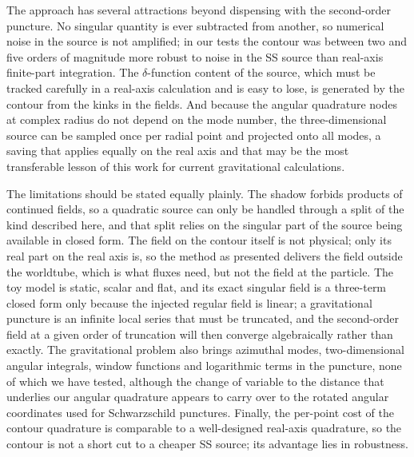 \documentclass[aps,prd,twocolumn,superscriptaddress,nofootinbib,floatfix]{revtex4-2}
\begin{document}
The approach has several attractions beyond dispensing with the second-order puncture.
No singular quantity is ever subtracted from another, so numerical noise in the source is not amplified; in our tests the contour was between two and five orders of magnitude more robust to noise in the SS source than real-axis finite-part integration.
The $\delta$-function content of the source, which must be tracked carefully in a real-axis calculation and is easy to lose, is generated by the contour from the kinks in the fields.
And because the angular quadrature nodes at complex radius do not depend on the mode number, the three-dimensional source can be sampled once per radial point and projected onto all modes, a saving that applies equally on the real axis and that may be the most transferable lesson of this work for current gravitational calculations.

The limitations should be stated equally plainly.
The shadow forbids products of continued fields, so a quadratic source can only be handled through a split of the kind described here, and that split relies on the singular part of the source being available in closed form.
The field on the contour itself is not physical; only its real part on the real axis is, so the method as presented delivers the field outside the worldtube, which is what fluxes need, but not the field at the particle.
The toy model is static, scalar and flat, and its exact singular field is a three-term closed form only because the injected regular field is linear; a gravitational puncture is an infinite local series that must be truncated, and the second-order field at a given order of truncation will then converge algebraically rather than exactly.
The gravitational problem also brings azimuthal modes, two-dimensional angular integrals, window functions and logarithmic terms in the puncture, none of which we have tested, although the change of variable to the distance that underlies our angular quadrature appears to carry over to the rotated angular coordinates used for Schwarzschild punctures.
Finally, the per-point cost of the contour quadrature is comparable to a well-designed real-axis quadrature, so the contour is not a short cut to a cheaper SS source; its advantage lies in robustness.
\end{document}
